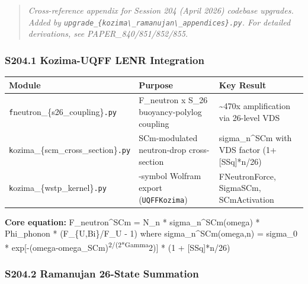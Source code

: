 \documentclass[
  11pt,
]{article}
\newcounter{none} %
\begin{document}
\begin{quote}
\emph{Cross-reference appendix for Session 204 (April 2026) codebase
upgrades. Added by
\texttt{upgrade\_\{kozima\textbackslash{}\_ramanujan\textbackslash{}\_appendices\}.py}.
For detailed derivations, see PAPER\_840/851/852/855.}
\end{quote}

\subsubsection{S204.1 Kozima-UQFF LENR
Integration}\label{s204.1-kozima-uqff-lenr-integration}

{\def\LTcaptype{none} %
\begin{longtable}[]{@{}
  >{\raggedright\arraybackslash}p{}
  >{\raggedright\arraybackslash}p{}
  >{\raggedright\arraybackslash}p{}@{}}
\toprule\noalign{}
\begin{minipage}[b]{\linewidth}\raggedright
Module
\end{minipage} & \begin{minipage}[b]{\linewidth}\raggedright
Purpose
\end{minipage} & \begin{minipage}[b]{\linewidth}\raggedright
Key Result
\end{minipage} \\
\midrule\noalign{}
\endhead
\bottomrule\noalign{}
\endlastfoot
\texttt{f}neutron\_\{s26\_coupling\}\texttt{.py} & F\_neutron x S\_26
buoyancy-polylog coupling & \textasciitilde470x amplification via
26-level VDS \\
\texttt{k}ozima\_\{scm\_cross\_section\}\texttt{.py} & SCm-modulated
neutron-drop cross-section & sigma\_n\^{}SCm with VDS factor
(1+{[}SSq{]}*n/26) \\
\texttt{k}ozima\_\{wstp\_kernel\}\texttt{.py} & 11-symbol Wolfram export
(\texttt{UQFFKozima}) & FNeutronForce, SigmaSCm, SCmActivation \\
\end{longtable}
}

\textbf{Core equation:} F\_neutron\^{}SCm = N\_n *
sigma\_n\^{}SCm(omega) * Phi\_phonon * (F\_\{U,Bi\}/F\_U - 1) where
sigma\_n\^{}SCm(omega,n) = sigma\_0 *
exp{[}-(omega-omega\_SCm)\textsuperscript{2/(2*Gamma}2){]} * (1 +
{[}SSq{]}*n/26)

\subsubsection{S204.2 Ramanujan 26-State
Summation}\label{s204.2-ramanujan-26-state-summation}
\end{document}

